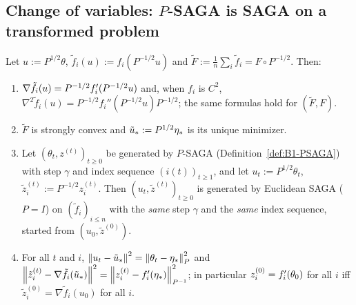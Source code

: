 \subsection{Change of variables: \texorpdfstring{$P$}{P}-SAGA is SAGA on a transformed problem}
\label{sec:B1-transfer}

\begin{proposition}\label{prop:B1-transfer}
Let $u:=P^{1/2}\theta$, $\tilde f_i(u):=f_i(P^{-1/2}u)$ and $\tilde F:=\frac1n\sum_i\tilde f_i=F\circ P^{-1/2}$.
Then:
\begin{enumerate}[label=(\roman*)]
\item $\nabla\tilde f_i(u)=P^{-1/2}f'_i(P^{-1/2}u)$ and, when $f_i$ is $C^2$,
$\nabla^2\tilde f_i(u)=P^{-1/2}f_i''(P^{-1/2}u)P^{-1/2}$; the same formulas hold for $(\tilde F,F)$.
\item $\tilde F$ is strongly convex and $\tilde u_*:=P^{1/2}\eta_\ast$ is its unique minimizer.
\item Let $(\theta_t,z^{(t)})_{t\ge0}$ be generated by $P$-SAGA (Definition~\ref{def:B1-PSAGA}) with step
$\gamma$ and index sequence $(i(t))_{t\ge1}$, and let $u_t:=P^{1/2}\theta_t$,
$\tilde z_i^{(t)}:=P^{-1/2}z_i^{(t)}$. Then $(u_t,\tilde z^{(t)})_{t\ge0}$ is generated by Euclidean SAGA
($P=I$) on $(\tilde f_i)_{i\le n}$ with the \emph{same} step $\gamma$ and the \emph{same} index sequence,
started from $(u_0,\tilde z^{(0)})$.
\item For all $t$ and $i$,
$\left\|u_t-\tilde u_*\right\|^2=\left\|\theta_t-\eta_\ast\right\|_P^2$ and
$\left\|\tilde z_i^{(t)}-\nabla\tilde f_i(\tilde u_*)\right\|^2=\left\|z_i^{(t)}-f'_i(\eta_\ast)\right\|_{P^{-1}}^2$;
in particular $z_i^{(0)}=f'_i(\theta_0)$ for all $i$ iff $\tilde z_i^{(0)}=\nabla\tilde f_i(u_0)$ for all $i$.
\end{enumerate}
\end{proposition}
